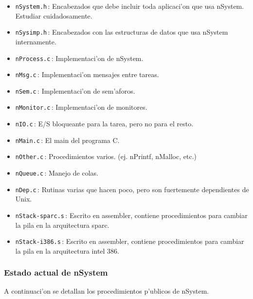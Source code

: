 \begin{itemize}

\item {\tt nSystem.h}\,: Encabezados que debe incluir toda aplicaci'on
que usa nSystem.  Estudiar cuidadosamente.

\item {\tt nSysimp.h}\,: Encabezados con las estructuras de datos que
usa nSystem internamente.

\item {\tt nProcess.c}\,: Implementaci'on de nSystem.

\item {\tt nMsg.c}\,: Implementaci'on mensajes entre tareas.

\item {\tt nSem.c}\,: Implementaci'on de sem'aforos.

\item {\tt nMonitor.c}\,: Implementaci'on de monitores.

\item {\tt nIO.c}\,: E/S bloqueante para la tarea, pero no para el resto.

\item {\tt nMain.c}\,: El main del programa C.

\item {\tt nOther.c}\,: Procedimientos varios. (ej. nPrintf, nMalloc, etc.) 

\item {\tt nQueue.c}\,: Manejo de colas.

\item {\tt nDep.c}\,: Rutinas varias que hacen poco, pero son
fuertemente dependientes de Unix.

\item {\tt nStack-sparc.s}\,: Escrito en assembler, contiene procedimientos
para cambiar la pila en la arquitectura sparc.

\item {\tt nStack-i386.s}\,: Escrito en assembler, contiene procedimientos
para cambiar la pila en la arquitectura intel 386.

\end{itemize}

\subsubsection*{ Estado actual de nSystem }

A continuaci'on se detallan los procedimientos p'ublicos de nSystem.

